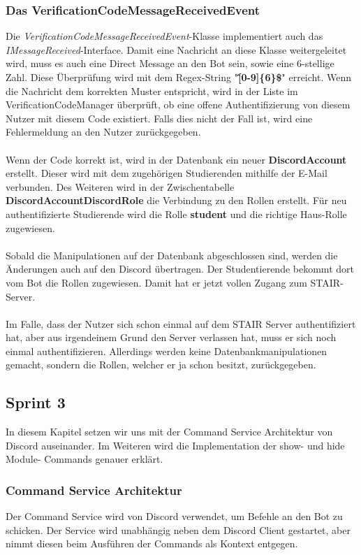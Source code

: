 \documentclass[a4paper, table]{article}
\begin{document}
\subsubsection*{Das VerificationCodeMessageReceivedEvent}
Die \textit{VerificationCodeMessageReceivedEvent}-Klasse implementiert auch das \textit{IMessageReceived}-Interface. 
Damit eine Nachricht an diese Klasse weitergeleitet wird, muss es auch eine Direct Message an den Bot sein, sowie eine 6-stellige Zahl. 
Diese Überprüfung wird mit dem Regex-String "\textbf{\^[0-9]\{6\}\$}" erreicht. 
Wenn die Nachricht dem korrekten Muster entspricht, wird in der Liste im VerificationCodeManager überprüft, ob eine offene Authentifizierung von diesem Nutzer mit diesem Code existiert. 
Falls dies nicht der Fall ist, wird eine Fehlermeldung an den Nutzer zurückgegeben.\\\\
Wenn der Code korrekt ist, wird in der Datenbank ein neuer \textbf{DiscordAccount} erstellt. 
Dieser wird mit dem zugehörigen Studierenden mithilfe der E-Mail verbunden. 
Des Weiteren wird in der Zwischentabelle \textbf{DiscordAccountDiscordRole} die Verbindung zu den Rollen erstellt. 
Für neu authentifizierte Studierende wird die Rolle \textbf{student} und die richtige Haus-Rolle zugewiesen.\\\\
Sobald die Manipulationen auf der Datenbank abgeschlossen sind, werden die Änderungen auch auf den Discord übertragen. 
Der Studentierende bekommt dort vom Bot die Rollen zugewiesen. Damit hat er jetzt vollen Zugang zum STAIR-Server.\\\\
Im Falle, dass der Nutzer sich schon einmal auf dem STAIR Server authentifiziert hat, aber aus irgendeinem Grund den Server verlassen hat, muss er sich noch einmal authentifizieren. 
Allerdings werden keine Datenbankmanipulationen gemacht, sondern die Rollen, welcher er ja schon besitzt, zurückgegeben.

\newpage
\subsection{Sprint 3}
In diesem Kapitel setzen wir uns mit der Command Service Architektur von Discord auseinander. 
Im Weiteren wird die Implementation der show- und hide Module- Commands genauer erklärt.

\subsubsection{Command Service Architektur}
Der Command Service wird von Discord verwendet, um Befehle an den Bot zu schicken. 
Der Service wird unabhängig neben dem Discord Client gestartet, aber nimmt diesen beim Ausführen der Commands als Kontext entgegen.
\end{document}
